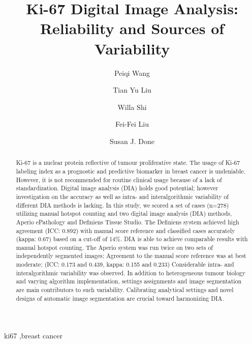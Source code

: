 \documentclass[final,1p,times]{elsarticle}
\begin{document}
\begin{frontmatter}

\title{Ki-67 Digital Image Analysis: Reliability and Sources of Variability}
\author[molgen]{Peiqi Wang}
\author[music]{Tian Yu Liu}
\author[pmh]{Willa Shi}
\author[pmh]{Fei-Fei Liu}
\author[pmh]{Susan J. Done}
\address[molgen]{Department of Molecular Genetics and Microbiology, University of Toronto, Canada}
\address[music]{Faculty of Music, Univeristy of Toronto, ON, Canada}
\address[pmh]{Princess Margaret Cancer Centre, Canada}

\begin{abstract}
Ki-67 is a nuclear protein reflective of tumour proliferative state. The usage of Ki-67 labeling index as a prognostic and predictive biomarker in breast cancer is undeniable. However, it is not recommended for routine clinical usage because of a lack of standardization. Digital image analysis (DIA) holds good potential; however investigation on the accuracy as well as intra- and interalgorithmic variability of different DIA methods is lacking. In this study, we scored a set of cases (n=278) utilizing manual hotspot counting and two digital image analysis (DIA) methods, Aperio ePathology and Definiens Tissue Studio. The Definiens system achieved high agreement (ICC: 0.892) with manual score reference and classified cases accurately (kappa: 0.67) based on a cut-off of 14\%. DIA is able to achieve comparable results with manual hotspot counting. The Aperio system was run twice on two sets of independently segmented images; Agreement to the manual score reference was at best moderate; (ICC: 0.173 and 0.439, kappa: 0.155 and 0.233) Considerable intra- and interalgorithmic variability was observed. In addition to heterogeneous tumour biology and varying algorithm implementation, settings assignments and image segmentation are main contributors to such variability. Calibrating analytical settings and novel designs of automatic image segmentation are crucial toward harmonizing DIA.


\end{abstract}

\begin{keyword}
ki67 \sep breast cancer
\end{keyword}

\end{frontmatter}

\linenumbers
\end{document}
